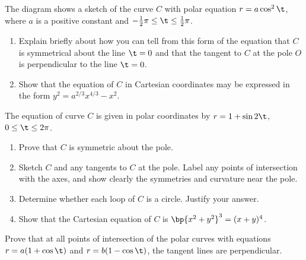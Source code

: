 \begin{problem}
    The diagram shows a sketch of the curve $C$ with polar equation $r = a\cos^2 \t$, where $a$ is a positive constant and $-\frac12 \pi \leq \t \leq \frac12 \pi$.

    \begin{center}
    \end{center}

    \begin{enumerate}
        \item Explain briefly about how you can tell from this form of the equation that $C$ is symmetrical about the line $\t = 0$ and that the tangent to $C$ at the pole $O$ is perpendicular to the line $\t = 0$.
        \item Show that the equation of $C$ in Cartesian coordinates may be expressed in the form $y^2 = a^{2/3} x^{4/3} - x^2$.
    \end{enumerate}
\end{problem}

\begin{problem}
    The equation of curve $C$ is given in polar coordinates by $r = 1 + \sin 2\t$, $0 \leq \t \leq 2\pi$. 
    \begin{enumerate}
        \item Prove that $C$ is symmetric about the pole.
        \item Sketch $C$ and any tangents to $C$ at the pole. Label any points of intersection with the axes, and show clearly the symmetries and curvature near the pole.
        \item Determine whether each loop of $C$ is a circle. Justify your answer.
        \item Show that the Cartesian equation of $C$ is $\bp{x^2 + y^2}^3 = (x+y)^4$.
    \end{enumerate}
\end{problem}

\begin{problem}[\chili]
    Prove that at all points of intersection of the polar curves with equations $r = a(1 + \cos \t)$ and $r = b(1 - \cos\t)$, the tangent lines are perpendicular.
\end{problem}